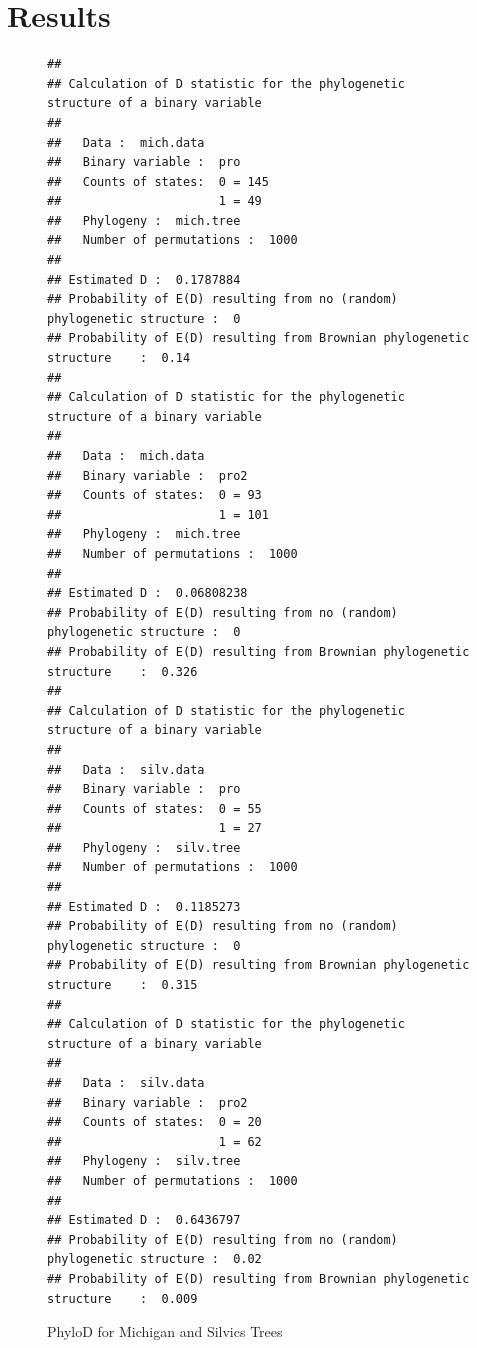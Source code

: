 \documentclass{article}\usepackage[]{graphicx}\usepackage[]{color}
\makeatletter
\newenvironment{kframe}{%
 \def\at@end@of@kframe{}%
 \ifinner\ifhmode%
  \def\at@end@of@kframe{\end{minipage}}%
  \begin{minipage}{\columnwidth}%
 \fi\fi%
 \def\FrameCommand##1{\hskip\@totalleftmargin \hskip-\fboxsep
 \colorbox{shadecolor}{##1}\hskip-\fboxsep
     \hskip-\linewidth \hskip-\@totalleftmargin \hskip\columnwidth}%
 \MakeFramed {\advance\hsize-\width
   \@totalleftmargin\z@ \linewidth\hsize
   \@setminipage}}%
 {\par\unskip\endMakeFramed%
 \at@end@of@kframe}
\newenvironment{knitrout}{}{} %
\makeatother
\begin{document}
\section*{Results}
\begin{figure}[h!]
\begin{knitrout}
\color{fgcolor}\begin{kframe}
\begin{verbatim}
## 
## Calculation of D statistic for the phylogenetic structure of a binary variable
## 
##   Data :  mich.data
##   Binary variable :  pro
##   Counts of states:  0 = 145
##                      1 = 49
##   Phylogeny :  mich.tree
##   Number of permutations :  1000
## 
## Estimated D :  0.1787884
## Probability of E(D) resulting from no (random) phylogenetic structure :  0
## Probability of E(D) resulting from Brownian phylogenetic structure    :  0.14
## 
## Calculation of D statistic for the phylogenetic structure of a binary variable
## 
##   Data :  mich.data
##   Binary variable :  pro2
##   Counts of states:  0 = 93
##                      1 = 101
##   Phylogeny :  mich.tree
##   Number of permutations :  1000
## 
## Estimated D :  0.06808238
## Probability of E(D) resulting from no (random) phylogenetic structure :  0
## Probability of E(D) resulting from Brownian phylogenetic structure    :  0.326
## 
## Calculation of D statistic for the phylogenetic structure of a binary variable
## 
##   Data :  silv.data
##   Binary variable :  pro
##   Counts of states:  0 = 55
##                      1 = 27
##   Phylogeny :  silv.tree
##   Number of permutations :  1000
## 
## Estimated D :  0.1185273
## Probability of E(D) resulting from no (random) phylogenetic structure :  0
## Probability of E(D) resulting from Brownian phylogenetic structure    :  0.315
## 
## Calculation of D statistic for the phylogenetic structure of a binary variable
## 
##   Data :  silv.data
##   Binary variable :  pro2
##   Counts of states:  0 = 20
##                      1 = 62
##   Phylogeny :  silv.tree
##   Number of permutations :  1000
## 
## Estimated D :  0.6436797
## Probability of E(D) resulting from no (random) phylogenetic structure :  0.02
## Probability of E(D) resulting from Brownian phylogenetic structure    :  0.009
\end{verbatim}
\end{kframe}
\end{knitrout}
\caption{PhyloD for Michigan and Silvics Trees}
\end{figure}
\end{document}

